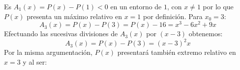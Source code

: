 \documentclass[12pt]{article}
\begin{document}
Es ${A}_1(x)=P(x)-P(1)<0$ en un entorno de $1$, con $x\neq1$ por lo que $P(x)$ presenta un máximo relativo en $x=1$ por definición. Para ${x}_0 = 3$:
$$
  {A}_3(x) = P(x)-P(3) = P(x)-16 = x^3-6x^2+9x
$$
Efectuando las sucesivas divisiones de ${A}_3(x)$ por $(x-3)$ obtenemos:
$$
  {A}_3(x) = P(x)-P(3) = (x-3)^2 x
$$
Por la misma argumentación, $P(x)$ presentará también extremo relativo en $x=3$ y al ser:










\end{document}
